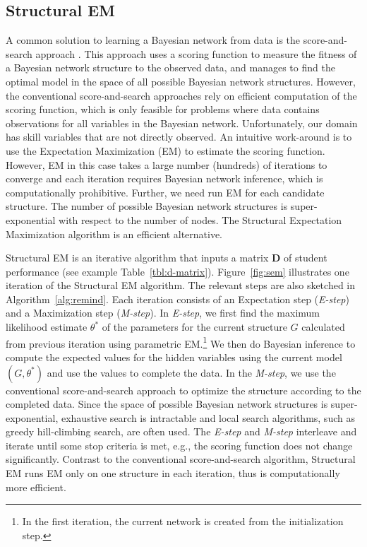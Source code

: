 \documentclass{edm_template}
\begin{document}
\subsection{Structural EM}

A common solution to learning a Bayesian network from data is the score-and-search approach \cite{cooper1992bayesian,heckerman1997bayesian}.
This approach uses a scoring function to measure the fitness of a Bayesian network structure to the observed data, 
and manages to find the optimal model in the space of all possible Bayesian network structures.
However, the conventional score-and-search approaches rely on efficient computation of the scoring function, 
which is only feasible for problems where data contains observations for all variables in the Bayesian network.
Unfortunately, our domain has skill variables that are not directly observed.
An intuitive work-around is to use the Expectation Maximization (EM) to estimate the scoring function.
However, EM in this case takes a large number (hundreds) of iterations to converge and each iteration requires Bayesian network inference, 
which is computationally prohibitive.
Further, we need run EM for each candidate structure. The number of possible Bayesian network structures is super-exponential with respect to the number of nodes.
The Structural Expectation Maximization algorithm \cite{friedman1997learning,friedman1998bayesian} is an efficient alternative.

Structural EM is an iterative algorithm that  inputs a matrix $\mathbf{D}$ of student performance (see example Table~\ref{tbl:d-matrix}). %
Figure~\ref{fig:sem} illustrates one iteration of the Structural EM algorithm. The relevant steps are also sketched in Algorithm~\ref{alg:remind}. 
Each iteration consists of an Expectation step (\emph{E-step}) and a Maximization step (\emph{M-step}). 
In \emph{E-step}, we first find the maximum likelihood estimate $\theta^*$ of the parameters 
for the current structure $G$ calculated from previous iteration using parametric EM.\footnote{In the first iteration, the current network is created from the initialization step.}
We then do Bayesian inference to compute the expected values for the hidden variables using the current model $(G,\theta^*)$
and use the values to complete the data.
In the \emph{M-step}, we use the conventional score-and-search approach to optimize the structure according to the completed data.
Since the space of possible Bayesian network structures is super-exponential, 
exhaustive search is intractable and local search algorithms, such as greedy hill-climbing search, are often used.
The \emph{E-step} and \emph{M-step} interleave and iterate until some stop criteria is met, e.g., the scoring function does not change significantly.
Contrast to the conventional score-and-search algorithm, Structural EM runs EM only on one structure in each iteration, thus is computationally more efficient.
\end{document}
